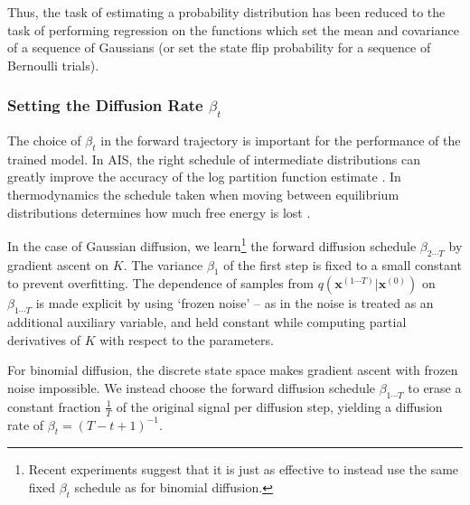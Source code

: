 \documentclass{article}
\newcommand{\mb}{\mathbf}
\newcommand{\pcondtraj}{q\left( \mb x^{(1\cdots T)} | \mb x^{(0)} \right)}
\begin{document}
Thus, the task of estimating a probability distribution has been reduced to the task of 
performing regression on the functions which set the mean and covariance of a sequence
of Gaussians (or set the state flip probability for a sequence of Bernoulli trials).

\subsubsection{Setting the Diffusion Rate $\beta_t$}

The choice of $\beta_t$ in the forward trajectory is important for the performance of the trained model.  In AIS, the right schedule of intermediate 
distributions can greatly improve the accuracy of the log partition function estimate \cite{grosse2013annealing}. 
In thermodynamics the schedule taken when moving 
between equilibrium distributions determines how much free energy is lost \cite{spinney2013fluctuation,jarzynski2013equalities}. %

In the case of Gaussian diffusion, we learn\footnote{Recent experiments suggest that it is just as effective to instead use the same fixed $\beta_t$ schedule as for binomial diffusion.} the forward diffusion schedule $\beta_{2\cdots T}$ by gradient ascent on $K$. The variance $\beta_1$ of the first step is fixed to a small constant to prevent overfitting.  The dependence of samples from $\pcondtraj$ on $\beta_{1\cdots T}$ is made explicit by using `frozen noise' -- as in \cite{Kingma2013} the noise is treated as an additional auxiliary variable, and held constant while computing partial derivatives of $K$ with respect to the parameters.

For binomial diffusion, the discrete state space makes gradient ascent with frozen noise impossible. 
We instead choose the forward diffusion schedule $\beta_{1\cdots T}$ to erase a constant fraction $\frac{1}{T}$ of the original signal per diffusion step, yielding a diffusion rate of $\beta_t = \left( T-t +1\right)^{-1}$.
\end{document}
